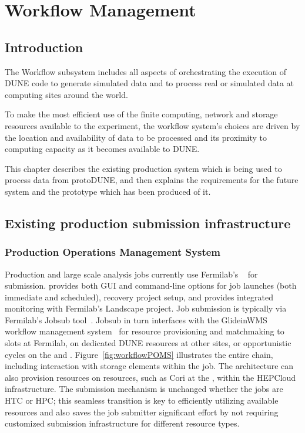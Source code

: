 \documentclass[../main-v1.tex]{subfiles}
\begin{document}
\chapter{Workflow Management }
\label{ch:wkflow}

\section{Introduction}
\label{sec:flow:intro} 

The Workflow subsystem includes all aspects of orchestrating the execution of DUNE code to generate simulated data and to process real or simulated data at computing sites around the world. 

To make the most efficient use of the finite computing, network and storage resources available to the experiment, the workflow system's choices are driven by the location and availability of data to be processed and its proximity to computing capacity as it becomes available to DUNE. 

This chapter describes the existing production system which is being used to process data from protoDUNE, and then explains the requirements for the future system and the prototype which has been produced of it.



\section{Existing production submission infrastructure }
\label{sec:current}

\subsection{Production Operations Management System}
\label{subsec:jobsub}

Production and large scale analysis jobs currently use Fermilab's ~\cite{Mengel:2020wev} for submission.  provides both GUI and command-line options for job launches (both immediate and scheduled), recovery project setup, and provides integrated monitoring with Fermilab's Landscape project. Job submission is typically via Fermilab's Jobsub tool~\cite{box2014fife}. Jobsub in
turn interfaces with the GlideinWMS workflow management system~\cite{sfiligoi2009pilot} for resource provisioning and matchmaking to slots at Fermilab, on dedicated DUNE resources at other sites, or opportunistic cycles on the    and . Figure~\ref{fig:workflowPOMS} illustrates the entire chain, including interaction with storage elements within the job.
The architecture can also provision resources on  resources, such as Cori at the , within the HEPCloud~\cite{mhashilkar2019hepcloud} infrastructure. The submission mechanism is unchanged whether the jobs are HTC or HPC; this seamless transition is key to efficiently utilizing available resources and also saves the job submitter significant effort by not requiring customized submission infrastructure for different resource types.
\end{document}
